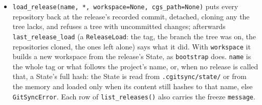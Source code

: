 \begin{itemize}
    project, newest first: \texttt{tag}, \texttt{version},
    \texttt{recorded\_at}, \texttt{by}, \texttt{state},
    \texttt{made\_with}, \texttt{source} (\texttt{ledger}, \texttt{tag},
    \texttt{ledger+tag} or \texttt{tag only}) and \texttt{loadable}. It
    reads the ledger and the root repository's tags, so a release another
    user made is listed too.
  \item \texttt{load\_release(name, *, workspace=None, cgs\_path=None)}
    puts every repository back at the release's recorded commit, detached,
    cloning any the tree lacks, and refuses a tree with uncommitted changes;
    afterwards \texttt{last\_release\_load} (a \texttt{ReleaseLoad}: the tag,
    the branch the tree was on, the repositories cloned, the ones left
    alone) says what it did. With \texttt{workspace} it builds a new
    workspace from the release's State, as \texttt{bootstrap} does.
    \texttt{name} is the whole tag or what follows the project's name, or,
    when no release is called that, a State's full hash: the State is read
    from \texttt{.cgitsync/state/} or from the memory and loaded only when its
    content still hashes to that name, else \texttt{GitSyncError}. Each
    row of \texttt{list\_releases()} also carries the freeze \texttt{message}.
\end{itemize}

